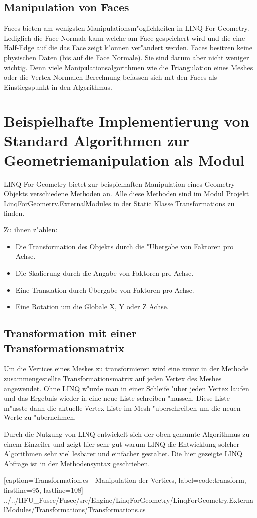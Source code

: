 \documentclass[pagesize, paper=a4, fontsize=12pt,titlepage=true, headings=small, headnosepline, abstractoff, liststotoc, nochapterprefix, plainheadsepline]{scrreprt}
\newcommand{\LFG}{LINQ For Geometry}
\newcommand{\LFGS}{LINQ For Geometry }
\begin{document}
		\subsection {Manipulation von Faces}
			Faces bieten am wenigsten Manipulationsm"oglichkeiten in \LFG. Lediglich die Face Normale kann welche am Face gespeichert wird und die eine Half-Edge auf die das Face zeigt k"onnen ver"andert werden. Faces besitzen keine physischen Daten (bis auf die Face Normale). Sie sind darum aber nicht weniger wichtig. Denn viele Manipulationsalgorithmen wie die Triangulation eines Meshes oder die Vertex Normalen Berechnung befassen sich mit den Faces als Einstiegspunkt in den Algorithmus.
	\section {Beispielhafte Implementierung von Standard Algorithmen zur Geometriemanipulation als Modul}
	\LFGS bietet zur beispielhaften Manipulation eines Geometry Objekts verschiedene Methoden an. Alle diese Methoden sind im Modul Projekt LinqForGeometry.ExternalModules in der Static Klasse Transformations zu finden.

Zu ihnen z"ahlen:
\begin{itemize}
\item Die Transformation des Objekts durch die "Ubergabe von Faktoren pro Achse.
\item Die Skalierung durch die Angabe von Faktoren pro Achse.
\item Eine Translation durch Übergabe von Faktoren pro Achse.
\item Eine Rotation um die Globale X, Y oder Z Achse.
\end{itemize}

\subsection {Transformation mit einer Transformationsmatrix}
Um die Vertices eines Meshes zu transformieren wird eine zuvor in der Methode zusammengestellte Transformationsmatrix auf jeden Vertex des Meshes angewendet. Ohne LINQ w"urde man in einer Schleife "uber jeden Vertex laufen und das Ergebnis wieder in eine neue Liste schreiben "mussen. Diese Liste m"usste dann die aktuelle Vertex Liste im Mesh "uberschreiben um die neuen Werte zu "ubernehmen.

Durch die Nutzung von LINQ entwickelt sich der oben genannte Algorithmus zu einem Einzeiler und zeigt hier sehr gut warum LINQ die Entwicklung solcher Algorithmen sehr viel lesbarer und einfacher gestaltet. Die hier gezeigte LINQ Abfrage ist in der Methodensyntax geschrieben.

			[caption={Transformation.cs - Manipulation der Vertices}, label=code:transform, firstline=95, lastline=108]
			{../../HFU_Fusee/Fusee/src/Engine/LinqForGeometry/LinqForGeometry.ExternalModules/Transformations/Transformations.cs}
\end{document}
